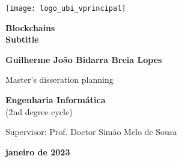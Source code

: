 \begin{titlepage}
\begin{center}

\begin{flushright}
 \texttt{[image: logo\_ubi\_vprincipal]}\\


\vspace{7.6cm}

\rostotitulo \textbf{Blockchains} \\
\rostosubtit \textbf{Subtitle}\\

\vspace{1.8cm}

\rostonomes \textbf{Guilherme João Bidarra Breia Lopes}\\

\vspace{1.4cm}


\rostooutros Master's disseration planning

\rostonomes \textbf{Engenharia Informática}\\
\rostooutros (2nd degree cycle)\\

\vspace{3.3cm}

\rostooutros Supervisor: Prof. Doctor Simão Melo de Sousa\\

\vspace{1.4cm}

\rostooutros \textbf{janeiro de 2023}

\end{flushright}

\end{center}
\end{titlepage}
